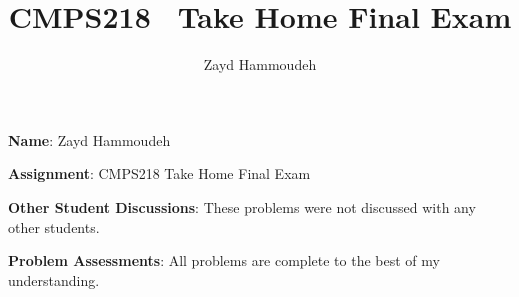 \documentclass{report}
\title{\textbf{CMPS218 \textendash\ Take Home Final Exam}}
\author{Zayd Hammoudeh}
\begin{document}
%
  \textbf{Name}: Zayd Hammoudeh

  \textbf{Assignment}: CMPS218 Take Home Final Exam

  \textbf{Other Student Discussions}: These problems were not discussed with any other students.

  \textbf{Problem Assessments}: All problems are complete to the best of my understanding.

  

  

  

  

  
\end{document}
